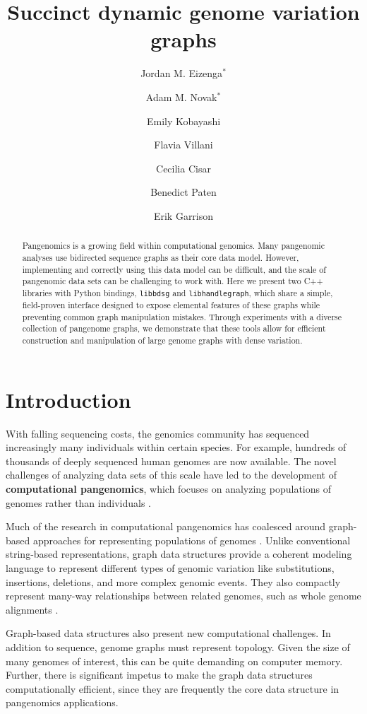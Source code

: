 \documentclass{article}
\title{Succinct dynamic genome variation graphs} %
\author{Jordan M. Eizenga$^*$ \and Adam M. Novak$^*$ \and Emily Kobayashi \and Flavia Villani \and Cecilia Cisar \and Benedict Paten \and Erik Garrison}
\newcommand{\vocab}{\textbf}
\begin{document}
\maketitle

\begin{abstract}

Pangenomics is a growing field within computational genomics.
Many pangenomic analyses use bidirected sequence graphs as their core data model.
However, implementing and correctly using this data model can be difficult, and the scale of pangenomic data sets can be challenging to work with.
Here we present two C++ libraries with Python bindings, \texttt{libbdsg} and \texttt{libhandlegraph}, which share a simple, field-proven interface designed to expose elemental features of these graphs while preventing common graph manipulation mistakes.
Through experiments with a diverse collection of pangenome graphs, we demonstrate that these tools allow for efficient construction and manipulation of large genome graphs with dense variation.

\end{abstract}

\section{Introduction}


With falling sequencing costs, the genomics community has sequenced increasingly many individuals within certain species.
For example, hundreds of thousands of deeply sequenced human genomes are now available.
The novel challenges of analyzing data sets of this scale have led to the development of \vocab{computational pangenomics}, which focuses on analyzing populations of genomes rather than individuals \cite{computational2016computational}.

Much of the research in computational pangenomics has coalesced around graph-based approaches for representing populations of genomes \cite{Paten_2017}.
Unlike conventional string-based representations, graph data structures provide a coherent modeling language to represent different types of genomic variation like substitutions, insertions, deletions, and more complex genomic events.
They also compactly represent many-way relationships between related genomes, such as whole genome alignments \cite{kehr2014genome}.

Graph-based data structures also present new computational challenges.
In addition to sequence, genome graphs must represent topology.
Given the size of many genomes of interest, this can be quite demanding on computer memory.
Further, there is significant impetus to make the graph data structures computationally efficient, since they are frequently the core data structure in pangenomics applications.
\end{document}
